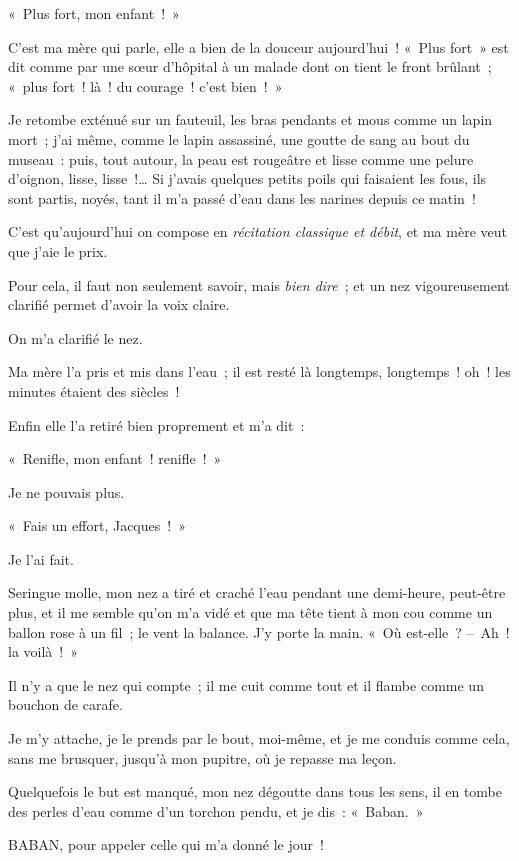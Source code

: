 \documentclass[french,twoside]{book} %
\begin{document}
\noindent « Plus fort, mon enfant ! »\par
C’est ma mère qui parle, elle a bien de la douceur aujourd’hui ! « Plus fort » est dit comme par une sœur d’hôpital à un malade dont on tient le front brûlant ; « plus fort ! là ! du courage ! c’est bien ! »\par
Je retombe exténué sur un fauteuil, les bras pendants et mous comme un lapin mort ; j’ai même, comme le lapin assassiné, une goutte de sang au bout du museau : puis, tout autour, la peau est rougeâtre et lisse comme une pelure d’oignon, lisse, lisse !… Si j’avais quelques petits poils qui faisaient les fous, ils sont partis, noyés, tant il m’a passé d’eau dans les narines depuis ce matin !\par
\bigbreak
\noindent C’est qu’aujourd’hui on compose en \emph{récitation classique et débit}, et ma mère veut que j’aie le prix.\par
Pour cela, il faut non seulement savoir, mais \emph{bien dire} ; et un nez vigoureusement clarifié permet d’avoir la voix claire.\par
On m’a clarifié le nez.\par
Ma mère l’a pris et mis dans l’eau ; il est resté là longtemps, longtemps ! oh ! les minutes étaient des siècles !\par
Enfin elle l’a retiré bien proprement et m’a dit :\par
« Renifle, mon enfant ! renifle ! »\par
Je ne pouvais plus.\par
« Fais un effort, Jacques ! »\par
Je l’ai fait.\par
\bigbreak
\noindent Seringue molle, mon nez a tiré et craché l’eau pendant une demi-heure, peut-être plus, et il me semble qu’on m’a vidé et que ma tête tient à mon cou comme un ballon rose à un fil ; le vent la balance. J’y porte la main. « Où est-elle ? – Ah ! la voilà ! »\par
Il n’y a que le nez qui compte ; il me cuit comme tout et il flambe comme un bouchon de carafe.\par
Je m’y attache, je le prends par le bout, moi-même, et je me conduis comme cela, sans me brusquer, jusqu’à mon pupitre, où je repasse ma leçon.\par
Quelquefois le but est manqué, mon nez dégoutte dans tous les sens, il en tombe des perles d’eau comme d’un torchon pendu, et je dis : « Baban. »\par
BABAN, pour appeler celle qui m’a donné le jour !\par
\end{document}
